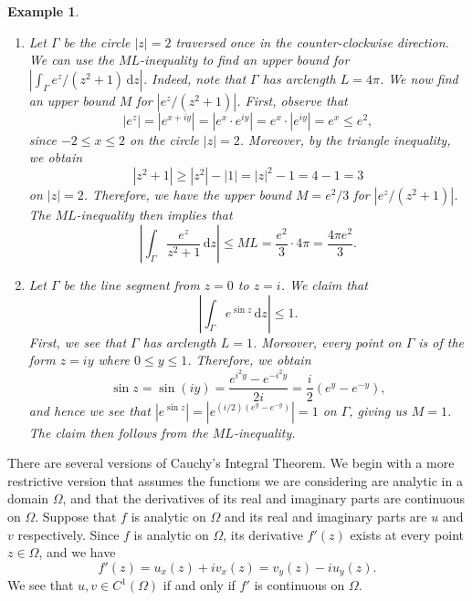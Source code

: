 \documentclass[10pt]{article}
\newcommand{\dd}{\,\mathrm{d}}
\theoremstyle{newstyle}
\newtheorem{exmp}[thm]{Example}
\begin{document}
\newpage
\begin{exmp}~
\begin{enumerate}[(1)]
    \item Let $\Gamma$ be the circle $|z| = 2$ traversed once in the counter-clockwise direction. 
    We can use the $ML$-inequality to find an upper bound for $|\int_\Gamma e^z/(z^2+1)\dd z|$. 
    Indeed, note that $\Gamma$ has arclength $L = 4\pi$. We now find an upper bound 
    $M$ for $|e^z/(z^2+1)|$. First, observe that 
    \[ |e^z| = |e^{x+iy}| = |e^x \cdot e^{iy}| = e^x \cdot |e^{iy}| = e^x \leq e^2, \]
    since $-2 \leq x \leq 2$ on the circle $|z| = 2$. Moreover, by the triangle inequality, 
    we obtain 
    \[ |z^2 + 1| \geq |z^2| - |1| = |z|^2 - 1 = 4-1 = 3 \]
    on $|z| = 2$. Therefore, we have the upper bound $M = e^2/3$ for 
    $|e^z/(z^2+1)|$. The $ML$-inequality then implies that 
    \[ \left| \int_\Gamma \frac{e^z}{z^2 + 1}\dd z \right| \leq ML = 
    \frac{e^2}3 \cdot 4\pi = \frac{4\pi e^2}3. \]
    \item Let $\Gamma$ be the line segment from $z = 0$ to $z = i$. We claim that 
    \[ \left| \int_\Gamma e^{\sin z}\dd z \right| \leq 1. \]
    First, we see that $\Gamma$ has arclength $L = 1$. Moreover, every point on $\Gamma$ is 
    of the form $z = iy$ where $0 \leq y \leq 1$. Therefore, we obtain 
    \[ \sin z = \sin(iy) = \frac{e^{i^2y} - e^{-i^2y}}{2i} = \frac{i}2 (e^y - e^{-y}), \]
    and hence we see that $|e^{\sin z}| = |e^{(i/2)(e^y - e^{-y})}| = 1$ on $\Gamma$, giving us $M = 1$. 
    The claim then follows from the $ML$-inequality. 
\end{enumerate}
\end{exmp}

There are several versions of Cauchy's Integral Theorem. We begin with a more restrictive 
version that assumes the functions we are considering are analytic in a domain $\Omega$, 
and that the derivatives of its real and imaginary parts are continuous on $\Omega$. 
Suppose that $f$ is analytic on $\Omega$ and its real and imaginary parts are $u$ and $v$ 
respectively. Since $f$ is analytic on $\Omega$, its derivative $f'(z)$ exists at 
every point $z \in \Omega$, and we have 
\[ f'(z) = u_x(z) + iv_x(z) = v_y(z) - iu_y(z). \]
We see that $u, v \in C^1(\Omega)$ if and only if $f'$ is continuous on $\Omega$. 
\end{document}
